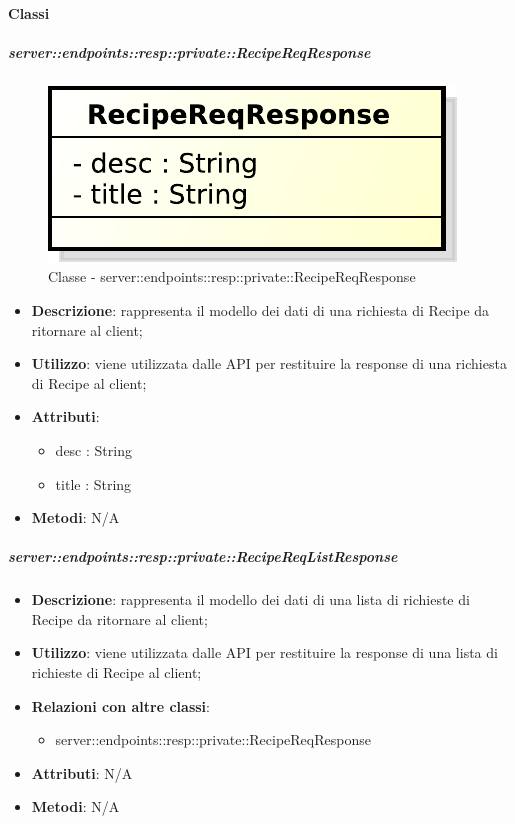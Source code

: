 	\paragraph{Classi} %

    \subparagraph{server::endpoints::resp::private::RecipeReqResponse} %
    \label{subp:bdsm_app_server_endpoints_resp_private_recipereqresponse}
	\begin{figure}[!htbp]
		\centering
		\centerline{\includegraphics[scale=0.6]{./images/server/classes/endpoints/recipe_req_response.pdf}}
		\caption{Classe - server::endpoints::resp::private::RecipeReqResponse}
	\end{figure}
    \begin{itemize}
      \item \textbf{Descrizione}: rappresenta il modello dei dati di una richiesta di Recipe da ritornare al client;
      \item \textbf{Utilizzo}: viene utilizzata dalle API per restituire la response di una richiesta di Recipe al client;
	  \item \textbf{Attributi}:
	  	\begin{itemize}
	  		\item desc : String
	  		\item title : String
	  	\end{itemize}
	  \item \textbf{Metodi}: N/A
      \end{itemize}

    \subparagraph{server::endpoints::resp::private::RecipeReqListResponse} %
    \label{subp:bdsm_app_server_endpoints_resp_private_recipereqlistresponse}
    \begin{itemize}
      \item \textbf{Descrizione}: rappresenta il modello dei dati di una lista di richieste di Recipe da ritornare al client;
      \item \textbf{Utilizzo}: viene utilizzata dalle API per restituire la response di una lista di richieste di Recipe al client;
      \item \textbf{Relazioni con altre classi}:
        \begin{itemize}
          \item server::endpoints::resp::private::RecipeReqResponse
        \end{itemize}
	  \item \textbf{Attributi}: N/A
	  \item \textbf{Metodi}: N/A
      \end{itemize}

